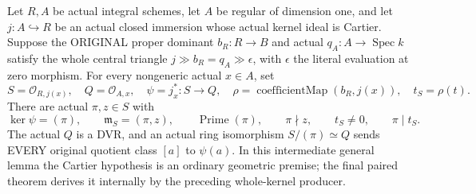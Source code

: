 \begin{lemma}
\label{lem:pl-gauss-paired-original-cartier-parameters}
\leanok
Let $R,A$ be actual integral schemes, let $A$ be regular of dimension
one, and let $j:A\hookrightarrow R$ be an actual closed immersion
whose actual kernel ideal is Cartier. Suppose the ORIGINAL proper
dominant $b_R:R\to B$ and actual $q_A:A\to\operatorname{Spec}k$
satisfy the whole central triangle
$j\gg b_R=q_A\gg\epsilon$, with $\epsilon$ the literal evaluation
at zero morphism. For every nongeneric actual $x\in A$, set
\[
 S=\mathcal O_{R,j(x)},\quad Q=\mathcal O_{A,x},\quad
 \psi=j_x^*:S\to Q,\quad
 \rho=\operatorname{coefficientMap}(b_R,j(x)),\quad t_S=\rho(t).
\]
There are actual $\pi,z\in S$ with
\[
 \ker\psi=(\pi),\qquad \mathfrak m_S=(\pi,z),\qquad
 \operatorname{Prime}(\pi),\qquad \pi\nmid z,\qquad
 t_S\ne0,\qquad \pi\mid t_S.
\]
The actual $Q$ is a DVR, and an actual ring isomorphism
$S/(\pi)\simeq Q$ sends EVERY original quotient class $[a]$ to
$\psi(a)$. In this intermediate general lemma the Cartier hypothesis
is an ordinary geometric premise; the final paired theorem derives
it internally by the preceding whole-kernel producer.
\end{lemma}
